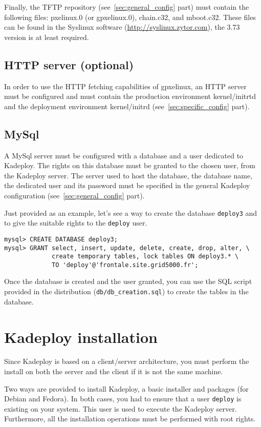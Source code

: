 \documentclass[a4wide,10pt,oneside]{book}
\begin{document}
Finally, the TFTP repository (see~\ref{sec:general_config} part) must contain the following files: pxelinux.0 (or gpxelinux.0), chain.c32, and mboot.c32. These files can be found in the Syslinux software (\url{http://syslinux.zytor.com}), the 3.73 version is at least required.

\subsection{HTTP server (optional)}
In order to use the HTTP fetching capabilities of gpxelinux, an HTTP server must be configured and must contain the production environment kernel/initrtd and the deployment environment kernel/initrd (see~\ref{sec:specific_config} part).

\subsection{MySql}
A MySql server must be configured with a database and a user dedicated to Kadeploy. The rights on this database must be granted to the chosen user, from the Kadeploy server. The server used to host the database, the database name, the dedicated user and its password must be specified in the general Kadeploy configuration (see~\ref{sec:general_config} part).

Just provided as an example, let's see a way to create the database \texttt{deploy3} and to give the suitable rights to the \texttt{deploy} user.
\begin{verbatim}
mysql> CREATE DATABASE deploy3;
mysql> GRANT select, insert, update, delete, create, drop, alter, \
             create temporary tables, lock tables ON deploy3.* \
             TO 'deploy'@'frontale.site.grid5000.fr';
\end{verbatim}

Once the database is created and the user granted, you can use the SQL script provided in the distribution (\texttt{db/db\_creation.sql}) to create the tables in the database.

\section{Kadeploy installation}
Since Kadeploy is based on a client/server architecture, you must perform the install on both the server and the client if it is not the same machine.

Two ways are provided to install Kadeploy, a basic installer and packages (for Debian and Fedora). In both cases, you had to ensure that a user \texttt{deploy} is existing on your system. This user is used to execute the Kadeploy server. Furthermore, all the installation operations must be performed with root rights.
\end{document}
